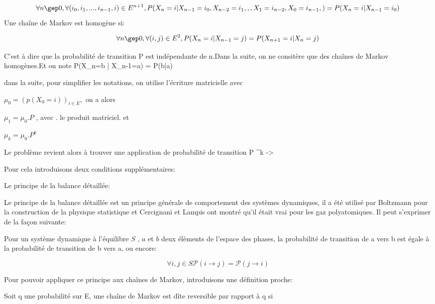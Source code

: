 \begin{equation}
\forall n \gep 0 , \forall (i_0,i_1,...,i_{n-1},i) \in E^{n+1}, P(X_n=i|X_{n-1}=i_0,X_{n-2}=i_1,,,X_{1}=i_{n-2},X_{0}=i_{n-1},) = P(X_n=i|X_{n-1}=i_0) 
\end{equation}
Une chaîne de Markov est homogène si:

\begin{equation}
  \label{eq_homog}
\forall n \gep 0 , \forall (i,j) \in E^2, P(X_n=i|X_{n-1}=j)= P(X_{n+1}=i|X_n=j) 
\end{equation}

C'est à dire que la probabilité de transition P est indépendante de n.Dans la suite, on ne consitère que des chaînes de Markov homogènes.Et on note P(X_n=b | X_{n-1}=a) = P(b|a)


dans la suite, pour simplifier les notations, on utilise l'écriture matricielle avec

$\mu_0 =(p(X_0=i))_{i \in E},$
on a alors

$\mu_1 =\mu_0 . P$   , avec . le produit matriciel.
et

$\mu_k =\mu_0 . P^k$



Le problème revient alors à trouver une application de probabilité de transition P \muP^k -> \pi

Pour cela introduisons deux conditions supplémentaires:


Le principe de la balance détaillée:

Le principe de la balance détaillée  est un principe générale de comportement des systèmes dynamiques, il a été utilisé par Boltzmann pour la construction de la physique statistique et Cercignani et Lampis ont montré qu'il était vrai pour les gaz polyatomiques. Il peut s'exprimer de la façon suivante:

Pour un système dynamique à l'équilibre $S$ , $a$ et $b$ deux élèments de l'espace des phases, la probabilité de transition de a vers b est égale à la probabilité de transition de b vers a, ou encore: 

\begin{equation}
\forall i,j \in S
\mathcal{P}(i \rightarrow j) = \mathcal{P}(j \rightarrow i) 
\end{equation}

Pour pouvoir appliquer ce principe aux chaînes de Markov, introduisons une définition proche:

Soit q une probabilité sur E, une chaîne de Markov est dîte reversible par rapport à q si

